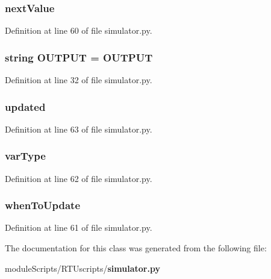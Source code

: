 \subsubsection[{next\+Value}]{\setlength{\rightskip}{0pt plus 5cm}next\+Value}\label{classsimulator_1_1procvar_a7e5b7dc5c76668a30ec6f390b21007c6}


Definition at line 60 of file simulator.\+py.

\subsubsection[{O\+U\+T\+P\+U\+T}]{\setlength{\rightskip}{0pt plus 5cm}string O\+U\+T\+P\+U\+T = \textquotesingle{}O\+U\+T\+P\+U\+T\textquotesingle{}\hspace{0.3cm}{\ttfamily [static]}}\label{classsimulator_1_1procvar_a35d5fe3e25b87eef946430fd9a612a6d}


Definition at line 32 of file simulator.\+py.

\subsubsection[{updated}]{\setlength{\rightskip}{0pt plus 5cm}updated}\label{classsimulator_1_1procvar_ae27e566dc7dcd1f77211f8374e4b017a}


Definition at line 63 of file simulator.\+py.

\subsubsection[{var\+Type}]{\setlength{\rightskip}{0pt plus 5cm}var\+Type}\label{classsimulator_1_1procvar_a6e4c30d3f4370895d44f4b751fa3fcdf}


Definition at line 62 of file simulator.\+py.

\subsubsection[{when\+To\+Update}]{\setlength{\rightskip}{0pt plus 5cm}when\+To\+Update}\label{classsimulator_1_1procvar_a765dfee3cf40cc3c8d61bedd1a2679c9}


Definition at line 61 of file simulator.\+py.



The documentation for this class was generated from the following file\+:\begin{DoxyCompactItemize}
\item 
module\+Scripts/\+R\+T\+Uscripts/{\bf simulator.\+py}\end{DoxyCompactItemize}
